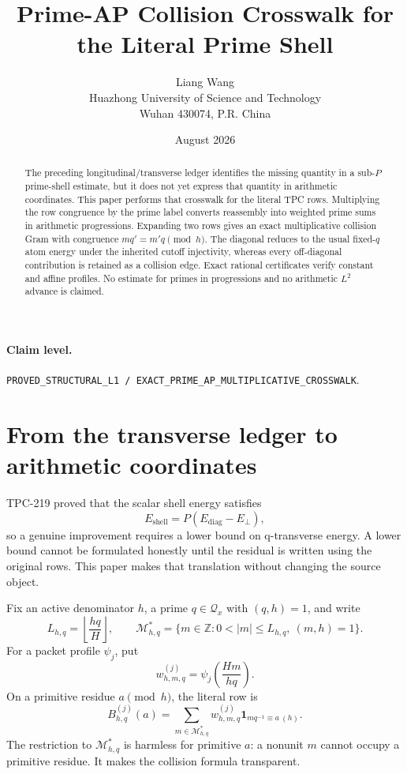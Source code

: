 \documentclass[11pt]{article}
\title{Prime-AP Collision Crosswalk for the Literal Prime Shell}
\author{Liang Wang\\Huazhong University of Science and Technology\\Wuhan 430074, P.R. China}
\date{August 2026}
\newcommand{\Qx}{\mathcal Q_x}
\newcommand{\M}{\mathcal M}
\begin{document}
\maketitle

\begin{abstract}
The preceding longitudinal/transverse ledger identifies the missing quantity in a
sub-$P$ prime-shell estimate, but it does not yet express that quantity in arithmetic
coordinates.  This paper performs that crosswalk for the literal TPC rows.  Multiplying
the row congruence by the prime label converts reassembly into weighted prime sums in
arithmetic progressions.  Expanding two rows gives an exact multiplicative collision Gram
with congruence $m q'=m' q\pmod h$.  The diagonal reduces to the usual fixed-$q$ atom
energy under the inherited cutoff injectivity, whereas every off-diagonal contribution is
retained as a collision edge.  Exact rational certificates verify constant and affine
profiles.  No estimate for primes in progressions and no arithmetic $L^2$ advance is
claimed.
\end{abstract}

\paragraph{Claim level.}
\texttt{PROVED\_STRUCTURAL\_L1 / EXACT\_PRIME\_AP\_MULTIPLICATIVE\_CROSSWALK}.

\section{From the transverse ledger to arithmetic coordinates}

TPC-219 proved that the scalar shell energy satisfies
\[
 E_{\mathrm{shell}}=P(E_{\mathrm{diag}}-E_{\perp}),
\]
so a genuine improvement requires a lower bound on q-transverse energy.  A lower bound
cannot be formulated honestly until the residual is written using the original rows.
This paper makes that translation without changing the source object.

Fix an active denominator $h$, a prime $q\in\Qx$ with $(q,h)=1$, and write
\[
 L_{h,q}=\left\lfloor\frac{hq}{H}\right\rfloor,
 \qquad
 \M_{h,q}^{*}=\{m\in\mathbb Z:0<|m|\leq L_{h,q},\ (m,h)=1\}.
\]
For a packet profile $\psi_j$, put
\[
 w_{h,m,q}^{(j)}=\psi_j\!\left(\frac{Hm}{hq}\right).
\]
On a primitive residue $a\pmod h$, the literal row is
\[
 B_{h,q}^{(j)}(a)=
 \sum_{m\in\M_{h,q}^{*}}w_{h,m,q}^{(j)}
 \mathbf 1_{m q^{-1}\equiv a\ (h)}. \tag{1}
\]
The restriction to $\M_{h,q}^{*}$ is harmless for primitive $a$: a nonunit $m$ cannot
occupy a primitive residue.  It makes the collision formula transparent.
\end{document}
